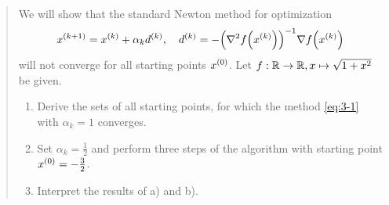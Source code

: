 \documentclass[english]{exercise}
\begin{document}
	\section{}

	\begin{quote}
		We will show that the standard Newton method for optimization
		\begin{equation}\label{eq:3-1}
			x^{\parentheses*{k + 1}} = x^{\parentheses*{k}} + \alpha_k d^{\parentheses*{k}}, \quad d^{\parentheses*{k}} = -\parentheses*{\nabla^2 f\parentheses*{x^{\parentheses*{k}}}}^{-1}\nabla f\parentheses*{x^{\parentheses*{k}}}
		\end{equation}
		will not converge for all starting points \(x^{\parentheses*{0}}\).
		Let \(f: \R \to \R, x \mapsto \sqrt{1 + x^2}\) be given.
		\begin{enumerate}
			\item Derive the sets of all starting points, for which the method \eqref{eq:3-1} with \(\alpha_k = 1\) converges.
			\item Set \(\alpha_k = \frac{1}{2}\) and perform three steps of the algorithm with starting point \(x^{\parentheses*{0}} = -\frac{3}{2}\).
			\item Interpret the results of a) and b).
		\end{enumerate}
	\end{quote}


	\section{}
\end{document}
